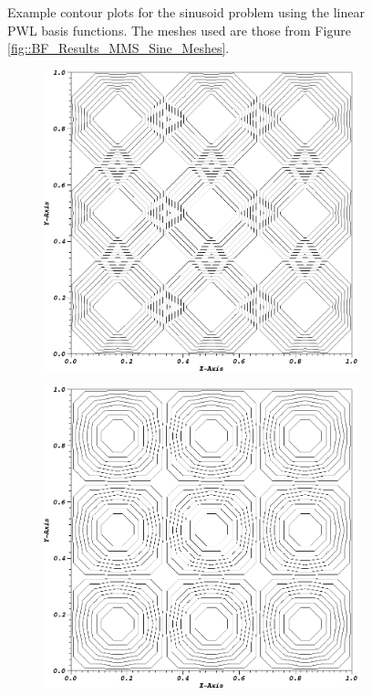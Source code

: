 \begin{figure}
{\begin{subfigure}[b]{0.45\textwidth}
	\end{subfigure}
}
\caption{Example contour plots for the sinusoid problem using the linear PWL basis functions. The meshes used are those from Figure \ref{fig::BF_Results_MMS_Sine_Meshes}.}
\label{fig::BF_Results_MMS_Sine_PWL1_Sol}
\end{figure}

\begin{figure}
\centering
{
	\begin{subfigure}[b]{0.45\textwidth}
		\centering
		\label{subfig::SineMMS_Cart00_PWL2}
		\includegraphics[width=\textwidth]{figures/sec_BF/MMSSine_PWLD2_Cart_cyc00.png}
	\end{subfigure}
	\hfill
	\begin{subfigure}[b]{0.45\textwidth}
		\centering
		\label{subfig::SineMMS_Cart01_PWL2}
		\includegraphics[width=\textwidth]{figures/sec_BF/MMSSine_PWLD2_Cart_cyc01.png}

\end{subfigure}}
\end{figure}
